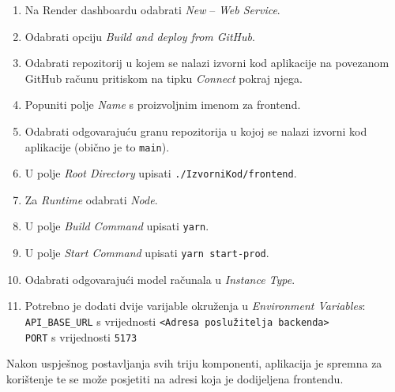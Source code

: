 \begin{enumerate}
	\item Na Render dashboardu odabrati \textit{New} -- \textit{Web Service}.
	\item Odabrati opciju \textit{Build and deploy from GitHub}.
	\item Odabrati repozitorij u kojem se nalazi izvorni kod aplikacije na povezanom GitHub računu pritiskom na tipku \textit{Connect} pokraj njega.
	\item Popuniti polje \textit{Name} s proizvoljnim imenom za frontend.
	\item Odabrati odgovarajuću granu repozitorija u kojoj se nalazi izvorni kod aplikacije (obično je to \verb+main+).
	\item U polje \textit{Root Directory} upisati \verb+./IzvorniKod/frontend+.
	\item Za \textit{Runtime} odabrati \textit{Node}.
	\item U polje \textit{Build Command} upisati \verb+yarn+.
	\item U polje \textit{Start Command} upisati \verb+yarn start-prod+.
	\item Odabrati odgovarajući model računala u \textit{Instance Type}.
	\item Potrebno je dodati dvije varijable okruženja u \textit{Environment Variables}:\\
	      \verb+API_BASE_URL+ s vrijednosti \verb+<Adresa poslužitelja backenda>+\\
	      \verb+PORT+ s vrijednosti \verb+5173+
\end{enumerate}

Nakon uspješnog postavljanja svih triju komponenti, aplikacija je spremna za korištenje te se može posjetiti na adresi koja je dodijeljena frontendu.


\eject
